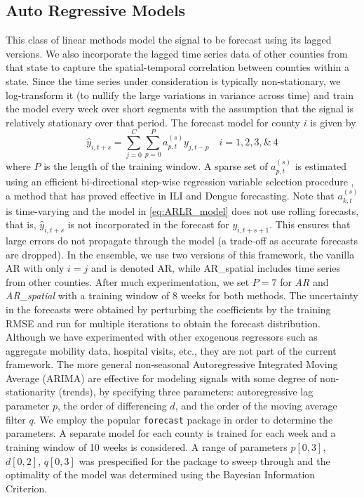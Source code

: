 \documentclass[sigconf]{acmart}
\begin{document}
\subsection{Auto Regressive Models}
This class of linear methods model the signal to be forecast using its lagged versions. We also incorporate the lagged time series data of other counties from that state to capture the spatial-temporal correlation between counties within a state. Since the time series under consideration is typically non-stationary, we log-transform it (to nullify the large variations in variance across time) and train the model every week over short segments with the assumption that the signal is relatively stationary over that period. The forecast model for county $i$ is given by
\begin{equation}
    \hat{y}_{i,t+s} = \sum_{j=0}^{C}\sum_{p=0}^{P} a^{(s)}_{p,t} y_{j,t-p}  \quad i=1, 2, 3, \&~ 4 
    \label{eq:ARLR_model}
\end{equation}
where $P$ is the length of the training window. A sparse set of $a^{(s)}_{p,t}$ is estimated using an efficient bi-directional step-wise regression variable selection procedure \cite{prashant2019PLOSCompBio, hocking1976biometrics}, a method that has proved effective in ILI and Dengue forecasting. Note that $a^{(s)}_{k,t}$ is time-varying and the model in \eqref{eq:ARLR_model} does not use rolling forecasts, that is, $\hat{y}_{i,t+s}$ is not incorporated in the forecast for ${y}_{i,t+s+1}$. This ensures that large errors do not propagate through the model (a trade-off as accurate forecasts are dropped). In the ensemble, we use two versions of this framework, the vanilla AR with only $i=j$ and is denoted AR, while AR\_spatial includes time series from other counties. After much experimentation, we set $P=7$ for \emph{AR} and \emph{AR\_spatial} with a training window of 8 weeks for both methods. The uncertainty in the forecasts were obtained by perturbing the coefficients by the training RMSE and run for multiple iterations to obtain the forecast distribution. Although we have experimented with other exogenous regressors such as aggregate mobility data, hospital visits, etc., they are not part of the current framework. The more general non-seasonal Autoregressive Integrated Moving Average (ARIMA) are effective for modeling signals with some degree of non-stationarity (trends), by specifying three parameters: autoregressive lag parameter $p$, the order of differencing $d$, and the order of the moving average filter $q$. We employ the popular \verb|forecast| package \cite{Hyndman2020forecast} in order to determine the parameters. A separate model for each county is trained for each week and a training window of 10 weeks is considered. A range of parameters $p[0,3]$, $d[0,2]$, $q[0,3]$ was prespecified for the package to sweep through and the optimality of the model was determined using the Bayesian Information Criterion.   
\end{document}
